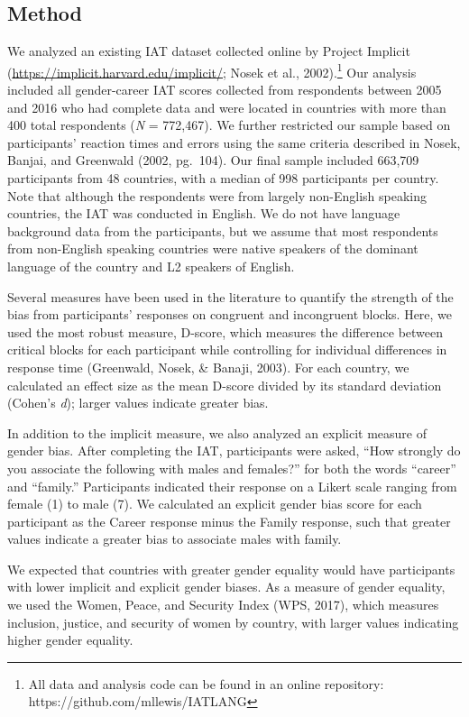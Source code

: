 \documentclass[10pt, letterpaper]{article}
\begin{document}
\subsection{Method}\label{method}

We analyzed an existing IAT dataset collected online by Project Implicit
(\url{https://implicit.harvard.edu/implicit/}; Nosek et al.,
2002).\footnote{All data and analysis code can be found in an online repository: https://github.com/mllewis/IATLANG}
Our analysis included all gender-career IAT scores collected from
respondents between 2005 and 2016 who had complete data and were located
in countries with more than 400 total respondents (\emph{N} = 772,467).
We further restricted our sample based on participants' reaction times
and errors using the same criteria described in Nosek, Banjai, and
Greenwald (2002, pg.~104). Our final sample included 663,709
participants from 48 countries, with a median of 998 participants per
country. Note that although the respondents were from largely
non-English speaking countries, the IAT was conducted in English. We do
not have language background data from the participants, but we assume
that most respondents from non-English speaking countries were native
speakers of the dominant language of the country and L2 speakers of
English.

Several measures have been used in the literature to quantify the
strength of the bias from participants' responses on congruent and
incongruent blocks. Here, we used the most robust measure, D-score,
which measures the difference between critical blocks for each
participant while controlling for individual differences in response
time (Greenwald, Nosek, \& Banaji, 2003). For each country, we
calculated an effect size as the mean D-score divided by its standard
deviation (Cohen's \emph{d}); larger values indicate greater bias.

In addition to the implicit measure, we also analyzed an explicit
measure of gender bias. After completing the IAT, participants were
asked, ``How strongly do you associate the following with males and
females?'' for both the words ``career'' and ``family.'' Participants
indicated their response on a Likert scale ranging from female (1) to
male (7). We calculated an explicit gender bias score for each
participant as the Career response minus the Family response, such that
greater values indicate a greater bias to associate males with family.

We expected that countries with greater gender equality would have
participants with lower implicit and explicit gender biases. As a
measure of gender equality, we used the Women, Peace, and Security Index
(WPS, 2017), which measures inclusion, justice, and security of women by
country, with larger values indicating higher gender equality.
\end{document}
